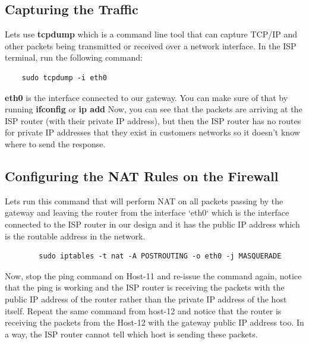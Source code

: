 \subsection{Capturing the Traffic}
Lets use \textbf{tcpdump} which is a command line tool that can capture TCP/IP and other packets being transmitted or received over a network interface.
\newline
\newline
In the ISP terminal, run the following command:
\begin{verbatim}
    sudo tcpdump -i eth0
\end{verbatim}

\textbf{eth0} is the interface connected to our gateway. You can make sure of that by running \textbf{ifconfig} or \textbf{ip add}
\newline
\newline
Now, you can see that the packets are arriving at the ISP router (with their private IP address), but then the ISP router has no routes for private IP addresses that they exist in customers networks so it doesn't know where to send the response.

\subsection{Configuring the NAT Rules on the Firewall}
Lets run this command that will perform NAT on all packets passing by the gateway and leaving the router from the interface `eth0` which is the interface connected to the ISP router in our design and it has the public IP address which is the routable address in the network.

\begin{verbatim}
		sudo iptables -t nat -A POSTROUTING -o eth0 -j MASQUERADE
\end{verbatim}

Now, stop the ping command on Host-11 and re-issue the command again, notice that the ping is working and the ISP router is receiving the packets with the public IP address of the router rather than the private IP address of the host itself.
\newline
\newline
Repeat the same command from host-12 and notice that the router is receiving the packets from the Host-12 with the gateway public IP address too.
\newline
\newline
In a way, the ISP router cannot tell which host is sending these packets.

